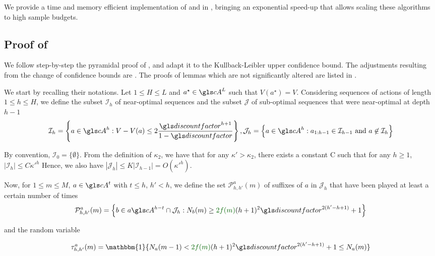 We provide a time and memory efficient implementation of \OLOP and \KLOLOP in , bringing an exponential speed-up that allows scaling these algorithms to high sample budgets.

\subsection{Proof of }
\label{sec:regret-proof}

We follow step-by-step the pyramidal proof of \citep{Bubeck2010}, and adapt it to the Kullback-Leibler upper confidence bound. The adjustments resulting from the change of confidence bounds are . The proofs of lemmas which are not significantly altered are listed in . 

We start by recalling their notations.
Let $1 \leq H \leq L$ and $a^{\star} \in \cA^L$ such that $V(a^{\star}) = V$.
Considering sequences of actions of length $1 \leq h \leq H$, we define the subset $\mathcal{I}_h$ of near-optimal sequences and the subset $\mathcal{J}$ of sub-optimal sequences that were near-optimal at depth $h-1$
\begin{equation*}
\mathcal{I}_h = \left\{a \in \cA^h: V - V(a) \leq 2\frac{\discount^{h+1}}{1-\discount}\right\}, \mathcal{J}_h = \left\{a \in \cA^h: a_{1:h-1} \in \mathcal{I}_{h-1} \text{ and } a \not\in \mathcal{I}_h\right\}
\end{equation*}

By convention, $\mathcal{I}_0 = \{\emptyset\}$. From the definition of $\kappa_2$, we have that for any $\kappa'>\kappa_2$, there exists a constant C such that for any $h \geq 1$,
$|\mathcal{I}_h| \leq C {\kappa'}^h$
Hence, we also have $|\mathcal{J}_h| \leq K|\mathcal{I}_{h-1}| = O({\kappa'}^h)$.

Now, for $1\leq m \leq M$, $a \in \cA^t$ with $t \leq h$, $h'<h$, we define the set $\mathcal{P}^a_{h,h'}(m)$ of suffixes of $a$ in $\mathcal{J}_h$ that have been played at least a certain number of times
\begin{equation*}
\mathcal{P}^a_{h,h'}(m) = \left\{ b\in a \cA^{h-t}\cap \mathcal{J}_h : N_b(m) \geq \diff{2f(m)}(h+1)^2\discount^{2(h'-h+1)} + 1 \right\}
\end{equation*}

and the random variable

\begin{equation*}
\tau^a_{h,h'}(m) = \mathbbm{1}\{N_a(m-1) < \diff{2f(m)}(h+1)^2\discount^{2(h'-h+1)} + 1 \leq N_a(m)\}
\end{equation*}

